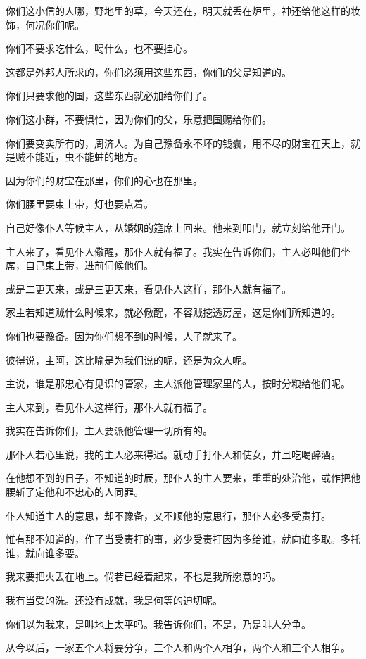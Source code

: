 \documentclass[12pt,oneside]{book}
\begin{document}
你们这小信的人哪，野地里的草，今天还在，明天就丢在炉里，神还给他这样的妆饰，何况你们呢。

你们不要求吃什么，喝什么，也不要挂心。

这都是外邦人所求的，你们必须用这些东西，你们的父是知道的。

你们只要求他的国，这些东西就必加给你们了。

你们这小群，不要惧怕，因为你们的父，乐意把国赐给你们。

你们要变卖所有的，周济人。为自己豫备永不坏的钱囊，用不尽的财宝在天上，就是贼不能近，虫不能蛀的地方。

因为你们的财宝在那里，你们的心也在那里。

你们腰里要束上带，灯也要点着。

自己好像仆人等候主人，从婚姻的筵席上回来。他来到叩门，就立刻给他开门。

主人来了，看见仆人儆醒，那仆人就有福了。我实在告诉你们，主人必叫他们坐席，自己束上带，进前伺候他们。

或是二更天来，或是三更天来，看见仆人这样，那仆人就有福了。

家主若知道贼什么时候来，就必儆醒，不容贼挖透房屋，这是你们所知道的。

你们也要豫备。因为你们想不到的时候，人子就来了。

彼得说，主阿，这比喻是为我们说的呢，还是为众人呢。

主说，谁是那忠心有见识的管家，主人派他管理家里的人，按时分粮给他们呢。

主人来到，看见仆人这样行，那仆人就有福了。

我实在告诉你们，主人要派他管理一切所有的。

那仆人若心里说，我的主人必来得迟。就动手打仆人和使女，并且吃喝醉酒。

在他想不到的日子，不知道的时辰，那仆人的主人要来，重重的处治他，或作把他腰斩了定他和不忠心的人同罪。

仆人知道主人的意思，却不豫备，又不顺他的意思行，那仆人必多受责打。

惟有那不知道的，作了当受责打的事，必少受责打因为多给谁，就向谁多取。多托谁，就向谁多要。

我来要把火丢在地上。倘若已经着起来，不也是我所愿意的吗。

我有当受的洗。还没有成就，我是何等的迫切呢。

你们以为我来，是叫地上太平吗。我告诉你们，不是，乃是叫人分争。

从今以后，一家五个人将要分争，三个人和两个人相争，两个人和三个人相争。
\end{document}
